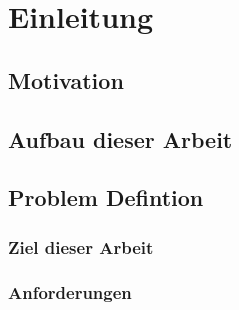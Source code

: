 %
%
%
% 


\chapter{Einleitung}
\label{chap:intro}

\section{Motivation }
\label{sec:IntroMotivation}

\section{Aufbau dieser Arbeit}
\label{sec:IntroAufbau}

\section{Problem Defintion}
\label{sec:IntroProblem}

\subsection{Ziel dieser Arbeit}
\label{sec:IntroZiel}

\subsection{Anforderungen}
\label{sec:IntroAnforderungen}


